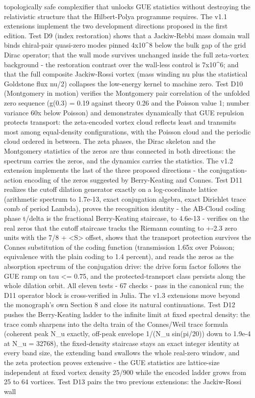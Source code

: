 \documentclass[11pt,a4paper]{article}
\begin{document}
\begin{tcolorbox}[breakable, colback=labblue!6, colframe=labblue!70!black, boxrule=0.6pt, title={Abstract / Аннотация}]
topologically safe complexifier that unlocks GUE statistics without destroying the relativistic structure that the Hilbert-Polya programme requires. The v1.1 extensions implement the two development directions proposed in the first edition. Test D9 (index restoration) shows that a Jackiw-Rebbi mass domain wall binds chiral-pair quasi-zero modes pinned 4x10\^{}8 below the bulk gap of the grid Dirac operator; that the wall mode survives unchanged inside the full zeta-vortex background - the restoration contrast over the wall-less control is 7x10\^{}6; and that the full composite Jackiw-Rossi vortex (mass winding nu plus the statistical Goldstone flux nu/2) collapses the low-energy kernel to machine zero. Test D10 (Montgomery in motion) verifies the Montgomery pair correlation of the unfolded zero sequence (g(0.3) = 0.19 against theory 0.26 and the Poisson value 1; number variance 60x below Poisson) and demonstrates dynamically that GUE repulsion protects transport: the zeta-encoded vortex cloud reflects least and transmits most among equal-density configurations, with the Poisson cloud and the periodic cloud ordered in between. The zeta phases, the Dirac skeleton and the Montgomery statistics of the zeros are thus connected in both directions: the spectrum carries the zeros, and the dynamics carries the statistics. The v1.2 extension implements the last of the three proposed directions - the conjugation-action encoding of the zeros suggested by Berry-Keating and Connes. Test D11 realizes the cutoff dilation generator exactly on a log-coordinate lattice (arithmetic spectrum to 1.7e-13, exact conjugation algebra, exact Dirichlet trace comb of period Lambda), proves the recognition identity - the AB-Cloud coding phase t/delta is the fractional Berry-Keating staircase, to 4.6e-13 - verifies on the real zeros that the cutoff staircase tracks the Riemann counting to +-2.3 zero units with the 7/8 + <S> offset, shows that the transport protection survives the Connes substitution of the coding function (transmission 1.65x over Poisson; equivalence with the plain coding to 1.4 percent), and reads the zeros as the absorption spectrum of the conjugation drive: the drive form factor follows the GUE ramp on tau <= 0.75, and the protected-transport class persists along the whole dilation orbit. All eleven tests - 67 checks - pass in the canonical run; the D11 operator block is cross-verified in Julia. The v1.3 extensions move beyond the monograph's own Section 8 and close its natural continuations. Test D12 pushes the Berry-Keating ladder to the infinite limit at fixed spectral density: the trace comb sharpens into the delta train of the Connes/Weil trace formula (coherent peak N\_\allowbreak{}u exactly, off-peak envelope 1/(N\_\allowbreak{}u sin(pi/20)) down to 1.9e-4 at N\_\allowbreak{}u = 32768), the fixed-density staircase stays an exact integer identity at every band size, the extending band swallows the whole real-zero window, and the zeta protection proves extensive - the GUE statistics are lattice-size independent at fixed vortex density 25/900 while the encoded ladder grows from 25 to 64 vortices. Test D13 pairs the two previous extensions: the Jackiw-Rossi wall 
\end{tcolorbox}
\end{document}
